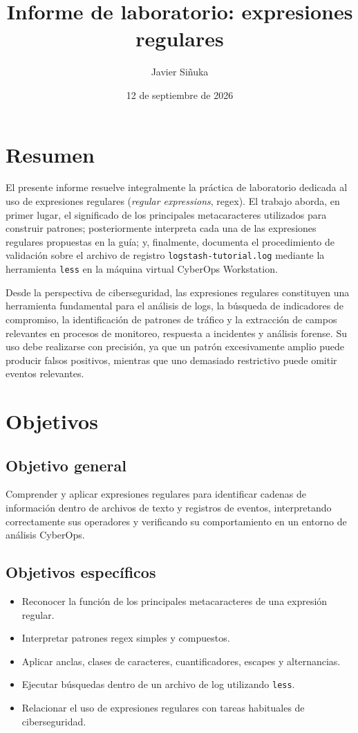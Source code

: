 \documentclass[11pt,a4paper]{article}
\title{Informe de laboratorio: expresiones regulares}
\author{Javier Siñuka}
\date{12 de septiembre de 2026}
\begin{document}
\maketitle
\thispagestyle{plain}

\clearpage
\tableofcontents
\newpage

\section{Resumen}

El presente informe resuelve integralmente la práctica de laboratorio dedicada al uso de expresiones regulares (\emph{regular expressions}, regex). El trabajo aborda, en primer lugar, el significado de los principales metacaracteres utilizados para construir patrones; posteriormente interpreta cada una de las expresiones regulares propuestas en la guía; y, finalmente, documenta el procedimiento de validación sobre el archivo de registro \texttt{logstash-tutorial.log} mediante la herramienta \texttt{less} en la máquina virtual CyberOps Workstation.

Desde la perspectiva de ciberseguridad, las expresiones regulares constituyen una herramienta fundamental para el análisis de logs, la búsqueda de indicadores de compromiso, la identificación de patrones de tráfico y la extracción de campos relevantes en procesos de monitoreo, respuesta a incidentes y análisis forense. Su uso debe realizarse con precisión, ya que un patrón excesivamente amplio puede producir falsos positivos, mientras que uno demasiado restrictivo puede omitir eventos relevantes.

\section{Objetivos}

\subsection{Objetivo general}
Comprender y aplicar expresiones regulares para identificar cadenas de información dentro de archivos de texto y registros de eventos, interpretando correctamente sus operadores y verificando su comportamiento en un entorno de análisis CyberOps.

\subsection{Objetivos específicos}
\begin{itemize}
    \item Reconocer la función de los principales metacaracteres de una expresión regular.
    \item Interpretar patrones regex simples y compuestos.
    \item Aplicar anclas, clases de caracteres, cuantificadores, escapes y alternancias.
    \item Ejecutar búsquedas dentro de un archivo de log utilizando \texttt{less}.
    \item Relacionar el uso de expresiones regulares con tareas habituales de ciberseguridad.
\end{itemize}
\end{document}
